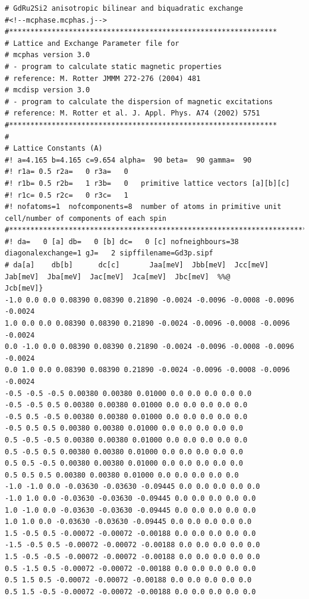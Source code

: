{\footnotesize
\begin{verbatim}
# GdRu2Si2 anisotropic bilinear and biquadratic exchange 
#<!--mcphase.mcphas.j-->
#***************************************************************
# Lattice and Exchange Parameter file for
# mcphas version 3.0
# - program to calculate static magnetic properties
# reference: M. Rotter JMMM 272-276 (2004) 481
# mcdisp version 3.0
# - program to calculate the dispersion of magnetic excitations
# reference: M. Rotter et al. J. Appl. Phys. A74 (2002) 5751
#***************************************************************
#
# Lattice Constants (A)
#! a=4.165 b=4.165 c=9.654 alpha=  90 beta=  90 gamma=  90
#! r1a= 0.5 r2a=   0 r3a=   0
#! r1b= 0.5 r2b=   1 r3b=   0   primitive lattice vectors [a][b][c]
#! r1c= 0.5 r2c=   0 r3c=   1
#! nofatoms=1  nofcomponents=8  number of atoms in primitive unit cell/number of components of each spin
#****************************************************************************}
#! da=   0 [a] db=   0 [b] dc=   0 [c] nofneighbours=38 diagonalexchange=1 gJ=   2 sipffilename=Gd3p.sipf
# da[a]    db[b]      dc[c]       Jaa[meV]  Jbb[meV]  Jcc[meV]  Jab[meV]  Jba[meV]  Jac[meV]  Jca[meV]  Jbc[meV]  %%@
Jcb[meV]} 
-1.0 0.0 0.0 0.08390 0.08390 0.21890 -0.0024 -0.0096 -0.0008 -0.0096 -0.0024 
1.0 0.0 0.0 0.08390 0.08390 0.21890 -0.0024 -0.0096 -0.0008 -0.0096 -0.0024 
0.0 -1.0 0.0 0.08390 0.08390 0.21890 -0.0024 -0.0096 -0.0008 -0.0096 -0.0024 
0.0 1.0 0.0 0.08390 0.08390 0.21890 -0.0024 -0.0096 -0.0008 -0.0096 -0.0024 
-0.5 -0.5 -0.5 0.00380 0.00380 0.01000 0.0 0.0 0.0 0.0 0.0 
-0.5 -0.5 0.5 0.00380 0.00380 0.01000 0.0 0.0 0.0 0.0 0.0 
-0.5 0.5 -0.5 0.00380 0.00380 0.01000 0.0 0.0 0.0 0.0 0.0 
-0.5 0.5 0.5 0.00380 0.00380 0.01000 0.0 0.0 0.0 0.0 0.0 
0.5 -0.5 -0.5 0.00380 0.00380 0.01000 0.0 0.0 0.0 0.0 0.0 
0.5 -0.5 0.5 0.00380 0.00380 0.01000 0.0 0.0 0.0 0.0 0.0 
0.5 0.5 -0.5 0.00380 0.00380 0.01000 0.0 0.0 0.0 0.0 0.0 
0.5 0.5 0.5 0.00380 0.00380 0.01000 0.0 0.0 0.0 0.0 0.0 
-1.0 -1.0 0.0 -0.03630 -0.03630 -0.09445 0.0 0.0 0.0 0.0 0.0 
-1.0 1.0 0.0 -0.03630 -0.03630 -0.09445 0.0 0.0 0.0 0.0 0.0 
1.0 -1.0 0.0 -0.03630 -0.03630 -0.09445 0.0 0.0 0.0 0.0 0.0 
1.0 1.0 0.0 -0.03630 -0.03630 -0.09445 0.0 0.0 0.0 0.0 0.0 
1.5 -0.5 0.5 -0.00072 -0.00072 -0.00188 0.0 0.0 0.0 0.0 0.0 
-1.5 -0.5 0.5 -0.00072 -0.00072 -0.00188 0.0 0.0 0.0 0.0 0.0 
1.5 -0.5 -0.5 -0.00072 -0.00072 -0.00188 0.0 0.0 0.0 0.0 0.0 
0.5 -1.5 0.5 -0.00072 -0.00072 -0.00188 0.0 0.0 0.0 0.0 0.0 
0.5 1.5 0.5 -0.00072 -0.00072 -0.00188 0.0 0.0 0.0 0.0 0.0 
0.5 1.5 -0.5 -0.00072 -0.00072 -0.00188 0.0 0.0 0.0 0.0 0.0 

\end{verbatim}}
